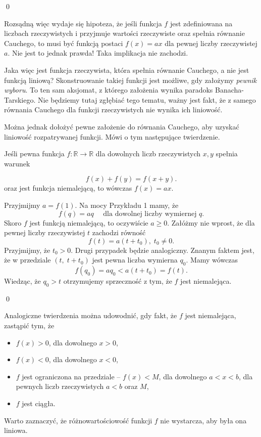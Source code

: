 \qed

\noindent
Rozsądną więc wydaje się hipoteza, że jeśli funkcja $f$ jest zdefiniowana na liczbach rzeczywistych i przyjmuje wartości rzeczywiste oraz spełnia równanie Cauchego, to musi być funkcją postaci $f(x) = ax$ dla pewnej liczby rzeczywistej $a$. Nie jest to jednak prawda! Taka implikacja nie zachodzi.

\vspace{10px}

\noindent
Jaka więc jest funkcja rzeczywista, która spełnia równanie Cauchego, a nie jest funkcją liniową? Skonstruowanie takiej funkcji jest możliwe, gdy założymy \textit{pewnik wyboru}. To ten sam aksjomat, z którego założenia wynika  paradoks Banacha-Tarskiego. Nie będziemy tutaj zgłębiać tego tematu, ważny jest fakt, że z samego równania Cauchego dla funkcji rzeczywistych nie wynika ich liniowość.

\vspace{10px}


\noindent
Można jednak dołożyć pewne założenie do równania Cauchego, aby uzyskać liniowość rozpatrywanej funkcji. Mówi o tym następujące twierdzenie.

\vspace{10px}


\noindent
Jeśli pewna funkcja $f:\mathbb{R}\longrightarrow\mathbb{R}$ dla dowolnych liczb rzeczywistych $x, y$ spełnia warunek

\[
	f(x) + f(y) = f(x + y).
\]
oraz jest funkcja niemalejącą, to wówczas $f(x) = ax$.

\vspace{10px}


\noindent
Przyjmijmy $a = f(1)$. Na mocy Przykładu 1 mamy, że 
\[
	f(q) = aq \quad \text{ dla dowolnej liczby wymiernej } q.
\]
Skoro $f$ jest funkcją niemalejącą, to oczywiście $a \geqslant 0$.
Załóżmy nie wprost, że dla pewnej liczby rzeczywistej $t$ zachodzi równość
\[
	f(t) = a(t + t_0), \; t_0 \neq 0.
\]
Przyjmijmy, że $t_0 > 0$. Drugi przypadek będzie analogiczny.
Znanym faktem jest, że w przedziale $(t, \; t + t_0)$ jest pewna liczba wymierna $q_0$. Mamy wówczas
\[
	f(q_0) = aq_0 < a(t + t_0) = f(t).
\]
Wiedząc, że $q_0 > t$ otrzymujemy sprzeczność z tym, że $f$ jest niemalejąca.

\qed

\newpage
\noindent
Analogiczne twierdzenia można udowodnić, gdy fakt, że $f$ jest niemalejąca, zastąpić tym, że 
\begin{itemize}
	\item $f(x) > 0$, dla dowolnego $x > 0$,
	\item $f(x) < 0$, dla dowolnego $x < 0$,
	\item $f$ jest ograniczona na przedziale -- $f(x) < M$, dla dowolnego $a < x < b$, dla pewnych liczb rzeczywistych $a < b$ oraz $M$,
	\item $f$ jest ciągła.
\end{itemize}
Warto zaznaczyć, że różnowartościowość funkcji $f$ nie wystarcza, aby była ona liniowa. 


